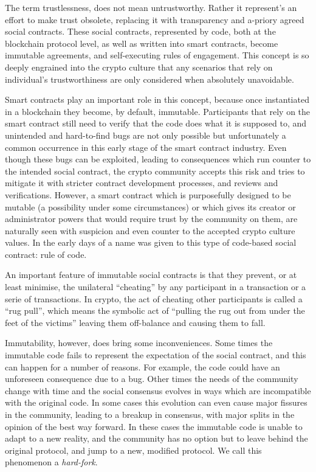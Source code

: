 The term trustlessness, does not mean untrustworthy. Rather it represent's an effort to make trust obsolete, replacing it with transparency and a-priory agreed social contracts. These social contracts, represented by code, both at the blockchain protocol level, as well as written into smart contracts, become immutable agreements, and self-executing rules of engagement. This concept is so deeply engrained into the crypto culture that any scenarios that rely on individual's trustworthiness are only considered when absolutely unavoidable.

Smart contracts play an important role in this concept, because once instantiated in a blockchain they become, by default, immutable. Participants that rely on the smart contract still need to verify that the code does what it is supposed to, and unintended and hard-to-find bugs are not only possible but unfortunately a common occurrence in this early stage of the smart contract industry. Even though these bugs can be exploited, leading to consequences which run counter to the intended social contract, the crypto community accepts this risk and tries to mitigate it with stricter contract development processes, and reviews and verifications. However, a smart contract which is purposefully designed to be mutable (a possibility under some circumstances) or which gives its creator or administrator powers that would require trust by the community on them, are naturally seen with suspicion and even counter to the accepted crypto culture values. In the early days of  a name was given to this type of code-based social contract: rule of code.

An important feature of immutable social contracts is that they prevent, or at least minimise, the unilateral ``cheating'' by any participant in a transaction or a serie of transactions. In crypto, the act of cheating other participants is called a ``rug pull'', which means the symbolic act of ``pulling the rug out from under the feet of the victims'' leaving them off-balance and causing them to fall.

Immutability, however, does bring some inconveniences. Some times the immutable code fails to represent the expectation of the social contract, and this can happen for a number of reasons. For example, the code could have an unforeseen consequence due to a bug. Other times the needs of the community change with time and the social consensus evolves in ways which are incompatible with the original code. In some cases this evolution can even cause major fissures in the community, leading to a breakup in consensus, with major splits in the opinion of the best way forward. In these cases the immutable code is unable to adapt to a new reality, and the community has no option but to leave behind the original protocol, and jump to a new, modified protocol. We call this phenomenon a \emph{hard-fork}.

